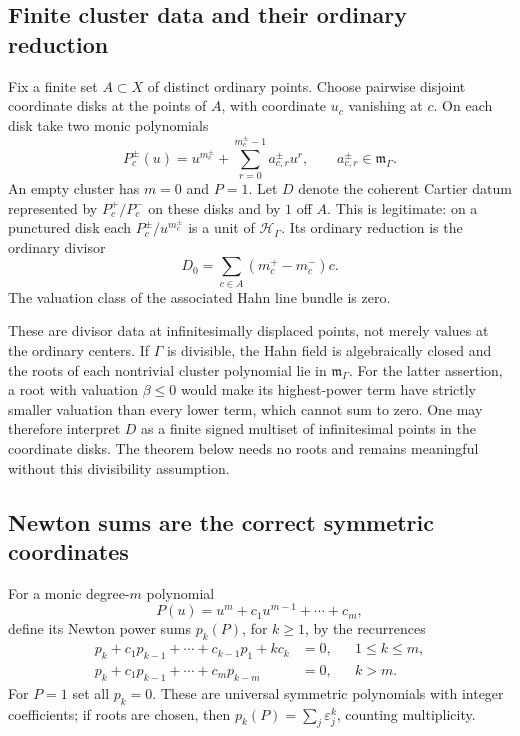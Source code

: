 \documentclass[11pt,letterpaper]{article}
\numberwithin{equation}{section}
\theoremstyle{definition}
\theoremstyle{remark}
\newcommand{\HH}{\mathcal H}
\newcommand{\mm}{\mathfrak m}
\newcommand{\Hg}{\HH_\Gamma}
\newcommand{\mg}{\mm_\Gamma}
\newcommand{\eps}{\varepsilon}
\begin{document}
\subsection{Finite cluster data and their ordinary reduction}
Fix a finite set $A\subset X$ of distinct ordinary points. Choose
pairwise disjoint coordinate disks at the points of $A$, with coordinate
$u_c$ vanishing at $c$. On each disk take two monic polynomials
\begin{equation}
 P_c^\pm(u)=u^{m_c^\pm}
       +\sum_{r=0}^{m_c^\pm-1}a_{c,r}^\pm u^r,
       \qquad a_{c,r}^\pm\in\mg.
 \label{eq:clusters}
\end{equation}
An empty cluster has $m=0$ and $P=1$. Let $D$ denote the coherent Cartier
datum represented by $P_c^+/P_c^-$ on these disks and by $1$ off $A$.
This is legitimate: on a punctured disk each $P_c^\pm/u^{m_c^\pm}$ is a
unit of $\Hg$. Its ordinary reduction is the ordinary divisor
\begin{equation}
 D_0=\sum_{c\in A}(m_c^+-m_c^-)c.
 \label{eq:D0}
\end{equation}
The valuation class of the associated Hahn line bundle is zero.

These are divisor data at infinitesimally displaced points, not merely
values at the ordinary centers. If $\Gamma$ is divisible, the Hahn
field is algebraically closed and the roots of each nontrivial cluster
polynomial lie in $\mg$. For the latter assertion, a root with valuation
$\beta\le0$ would make its highest-power term have strictly smaller
valuation than every lower term, which cannot sum to zero. One may
therefore interpret $D$ as a finite signed multiset of infinitesimal
points in the coordinate disks. The theorem below needs no roots and
remains meaningful without this divisibility assumption.

\subsection{Newton sums are the correct symmetric coordinates}
For a monic degree-$m$ polynomial
\[
 P(u)=u^m+c_1u^{m-1}+\cdots+c_m,
\]
define its Newton power sums $p_k(P)$, for $k\ge1$, by the recurrences
\begin{align}
 p_k+c_1p_{k-1}+\cdots+c_{k-1}p_1+kc_k&=0,
                    &&1\le k\le m,\label{eq:newtonlow}\\
 p_k+c_1p_{k-1}+\cdots+c_mp_{k-m}&=0,
                    &&k>m.\label{eq:newtonhigh}
\end{align}
For $P=1$ set all $p_k=0$. These are universal symmetric polynomials
with integer coefficients; if roots are chosen, then
$p_k(P)=\sum_j\eps_j^k$, counting multiplicity.
\end{document}
